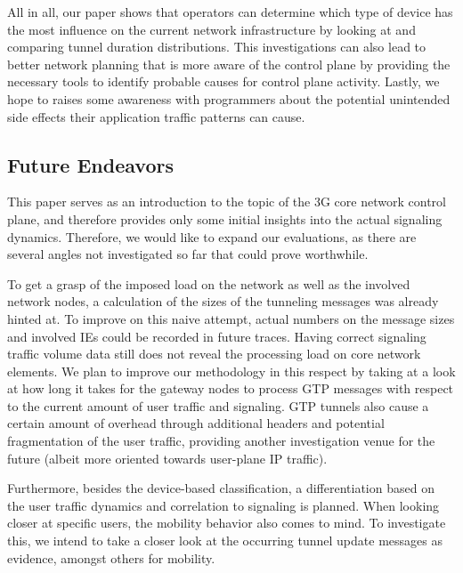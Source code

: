 All in all, our paper shows that operators can determine which type of device has the most influence on the current network infrastructure by looking at and comparing tunnel duration distributions. %
This investigations can also lead to better network planning that is more aware of the control plane by providing the necessary tools to identify probable causes for control plane activity. Lastly, we hope to raises some awareness with programmers about the potential unintended side effects their application traffic patterns can cause.

\subsection{Future Endeavors}

This paper serves as an introduction to the topic of the 3G core network control plane, and therefore provides only some initial insights into the actual signaling dynamics. Therefore, we would like to expand our evaluations, as there are several  angles not investigated so far that could prove worthwhile.

To get a grasp of the imposed load on the network as well as the involved network nodes, a calculation of the sizes of the tunneling messages was already hinted at. To improve on this naive attempt, actual numbers on the message sizes and involved \glspl{IE} could be recorded in future traces. Having correct signaling traffic volume data still does not reveal the processing load on core network elements. We plan to improve our methodology in this respect by taking at a look at how long it takes for the gateway nodes to process \gls{GTP} messages with respect to the current amount of user traffic and signaling. \gls{GTP} tunnels also cause a certain amount of overhead through additional headers and potential fragmentation of the user traffic, providing another investigation venue for the future (albeit more oriented towards user-plane IP traffic). 

Furthermore, besides the device-based classification, a differentiation based on the user traffic dynamics and correlation to signaling is planned. When looking closer at specific users, the mobility behavior also comes to mind. To investigate this, we intend to take a closer look at the occurring tunnel update messages as evidence, amongst others for mobility.

